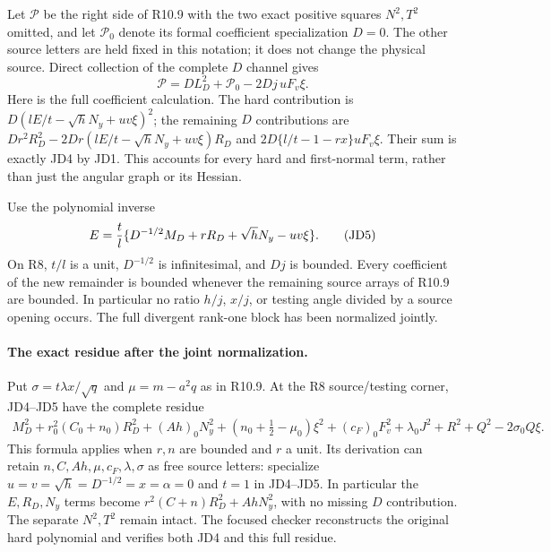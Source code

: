 Let $\mathscr P$ be the right side of R10.9 with the two exact
positive squares $N^2,T^2$ omitted, and let $\mathscr P_0$ denote
its formal coefficient specialization $D=0$.  The other source
letters are held fixed in this notation; it does not change the
physical source.  Direct collection of the complete $D$ channel gives
\[
 \boxed{\quad \mathscr P=D L_D^2+\mathscr P_0
                        -2Dj\,uF_v\xi.\quad}        \tag{JD4}
\]
Here is the full coefficient calculation.  The hard contribution is
$D(lE/t-\sqrt hN_y+uv\xi)^2$; the remaining $D$ contributions are
$Dr^2R_D^2-2Dr(lE/t-\sqrt hN_y+uv\xi)R_D$ and
$2D\{l/t-1-rx\}uF_v\xi$.  Their sum is exactly JD4 by JD1.
This accounts for every hard and first-normal term, rather than just
the angular graph or its Hessian.

Use the polynomial inverse
\[
 E={t\over l}\{D^{-1/2}M_D+rR_D+\sqrt hN_y-uv\xi\}. \tag{JD5}
\]
On R8, $t/l$ is a unit, $D^{-1/2}$ is infinitesimal, and $Dj$ is
bounded.  Every coefficient of the new remainder is bounded whenever
the remaining source arrays of R10.9 are bounded.  In particular no
ratio $h/j$, $x/j$, or testing angle divided by a source opening occurs.
The full divergent rank-one block has been normalized jointly.

\paragraph{The exact residue after the joint normalization.}
Put $\sigma=t\lambda x/\sqrt q$ and $\mu=m-a^2q$ as in R10.9.
At the R8 source/testing corner, JD4--JD5 have the complete residue
\[
 \begin{split}
 M_D^2+r_0^2(C_0+n_0)R_D^2+(Ah)_0N_y^2
  +(n_0+\tfrac12-\mu_0)\xi^2
  +(c_F)_0F_v^2+\lambda_0J^2+R^2+Q^2-2\sigma_0Q\xi.
 \end{split}                                                   \tag{JD6}
\]
This formula applies when $r,n$ are bounded and $r$ a unit.  Its
derivation can retain $n,C,Ah,\mu,c_F,\lambda,\sigma$ as free source
letters: specialize $u=v=\sqrt h=D^{-1/2}=x=\alpha=0$ and $t=1$
in JD4--JD5.  In particular the $E,R_D,N_y$ terms become
$r^2(C+n)R_D^2+AhN_y^2$, with no missing $D$ contribution.
The separate $N^2,T^2$ remain intact.  The focused checker reconstructs
the original hard polynomial and verifies both JD4 and this full
residue.

